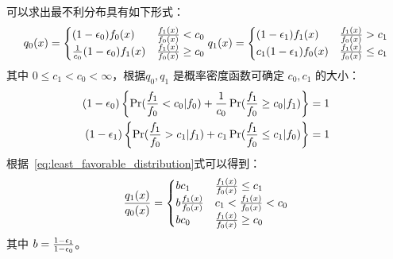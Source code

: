 \documentclass{ctexart}
\numberwithin{equation}{section}
\begin{document}
可以求出最不利分布具有如下形式：
\begin{equation}\label{eq:least_favorable_distribution}
q_0(x) = \begin{cases}
(1 - \epsilon_0) f_0(x) & { f_1(x) \over f_0(x) } < c_0 \\
{1 \over c_0 } (1 - \epsilon_0) f_1(x) & { f_1(x) \over f_0(x) } \geq c_0
\end{cases}
q_1(x) = \begin{cases}
(1 - \epsilon_1) f_1(x) & { f_1(x) \over f_0(x) } > c_1 \\
c_1 (1 - \epsilon_1) f_0(x) & { f_1(x) \over f_0(x) } \leq c_1
\end{cases}
\end{equation}
其中 $ 0 \leq c_1 < c_0 < \infty $，根据$ q_0, q_1 $ 是概率密度函数可确定 $ c_0, c_1 $ 的大小：
\begin{align}\label{eq:c1c0}
(1-\epsilon_0) \left\{ \Pr({f_1 \over f_0 } < c_0 | f_0)  + { 1 \over c_0} \Pr({f_1 \over f_0} \geq c_0 | f_1) \right\} & = 1 \\
(1-\epsilon_1) \left\{ \Pr({f_1 \over f_0 } > c_1 | f_1)  + c_1 \Pr({f_1 \over f_0} \leq c_1 | f_0) \right\} & = 1\nonumber
\end{align}
根据~\eqref{eq:least_favorable_distribution}式可以得到：
\begin{equation}\label{eq:q1q0_ratio}
{ q_1(x) \over q_0(x) } = \begin{cases}
bc_1 & {f_1(x) \over f_0(x) }\leq c_1 \\
b{f_1(x) \over f_0(x) } & c_1 < {f_1(x) \over f_0(x) } < c_0 \\
b c_0 &  {f_1(x) \over f_0(x) } \geq c_0 
\end{cases}
\end{equation}
其中 $ b = { 1 - \epsilon_1 \over 1 - \epsilon_0 } $。
\end{document}
